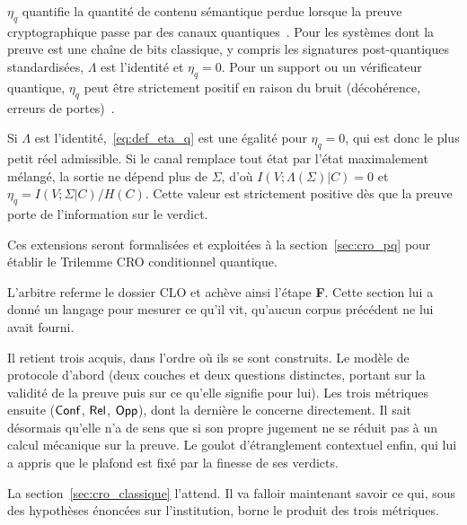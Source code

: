 \begin{sloppypar}
\begin{remark}
\label{rem:interpretation_physique}
$\eta_q$ quantifie la quantit\'e de contenu s\'emantique perdue lorsque la
preuve cryptographique passe par des canaux quantiques~\cite{Zurek2003,Schumacher1997}. Pour les syst\`emes
dont la preuve est une cha\^ine de bits classique, y compris les signatures
post-quantiques standardis\'ees, $\Lambda$ est l'identit\'e et $\eta_q = 0$. Pour
un support ou un v\'erificateur quantique, $\eta_q$ peut \^etre strictement
positif en raison du bruit (d\'ecoh\'erence, erreurs de portes)~\cite{Holevo1973,Preskill2018}.
\end{remark}

\begin{Preuve}
Si $\Lambda$ est l'identit\'e,~\eqref{eq:def_eta_q} est une \'egalit\'e pour
$\eta_q = 0$, qui est donc le plus petit r\'eel admissible. Si le canal remplace
tout \'etat par l'\'etat maximalement m\'elang\'e, la sortie ne d\'epend plus de
$\Sigma$, d'o\`u $I(V;\Lambda(\Sigma)|C) = 0$ et $\eta_q = I(V;\Sigma|C)/H(C)$.
Cette valeur est strictement positive d\`es que la preuve porte de l'information sur le verdict.
\end{Preuve}

Ces extensions seront formalis\'ees et exploit\'ees \`a la section~\ref{sec:cro_pq} pour \'etablir le Trilemme CRO conditionnel quantique.
\end{sloppypar}

\begin{boiteArbitre}
L'arbitre referme le dossier CLO et ach\`eve ainsi l'\'etape \textbf{F}. Cette section lui a donn\'e un
langage pour mesurer ce qu'il vit, qu'aucun corpus pr\'ec\'edent ne lui avait fourni.

Il retient trois acquis, dans l'ordre o\`u ils se sont
construits. Le mod\`ele de protocole d'abord (deux couches et deux questions
distinctes, portant sur la validit\'e de la preuve puis sur ce qu'elle signifie pour lui).
Les trois m\'etriques ensuite ($\mathsf{Conf}$, $\mathsf{Rel}$, $\mathsf{Opp}$), dont la derni\`ere
le concerne directement. Il sait d\'esormais qu'elle
n'a de sens que si son propre jugement ne se r\'eduit pas \`a un calcul
m\'ecanique sur la preuve. Le goulot d'\'etranglement contextuel enfin,
qui lui a appris que le plafond est fix\'e par la finesse de ses verdicts.

La section~\ref{sec:cro_classique} l'attend. Il va falloir maintenant
savoir ce qui, sous des hypoth\`eses \'enonc\'ees sur l'institution, borne
le produit des trois m\'etriques.
\end{boiteArbitre}